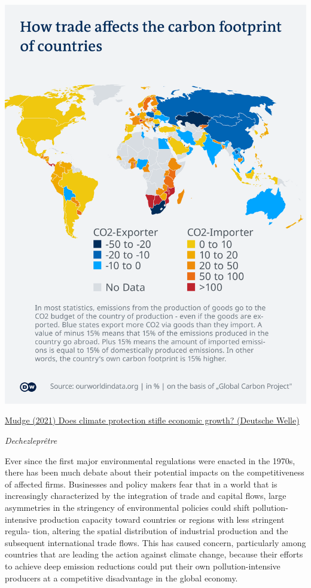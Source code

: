 \documentclass[
]{book}
\begin{document}
\includegraphics{fig/trade_carbon_footprint.png}

\href{https://www.dw.com/en/fact-check-does-climate-protection-stifle-economic-growth/a-58104531}{Mudge (2021) Does climate protection stifle economic growth? (Deutsche Welle)}

\emph{Dechezleprêtre}

Ever since the first major environmental regulations were enacted in the 1970s, there has been
much debate about their potential impacts on the competitiveness of affected firms. Businesses
and policy makers fear that in a world that is increasingly characterized by the integration of trade
and capital flows, large asymmetries in the stringency of environmental policies could shift
pollution-intensive production capacity toward countries or regions with less stringent regula-
tion, altering the spatial distribution of industrial production and the subsequent international
trade flows. This has caused concern, particularly among countries that are leading the action
against climate change, because their efforts to achieve deep emission reductions could put their
own pollution-intensive producers at a competitive disadvantage in the global economy.
\end{document}
